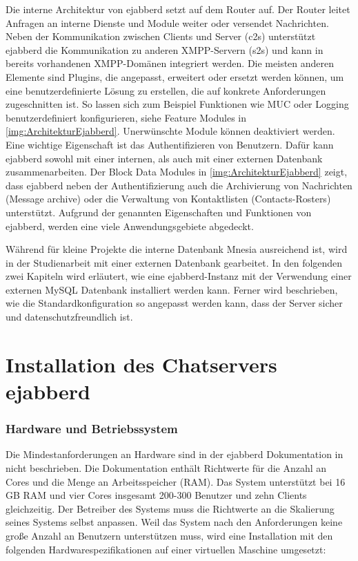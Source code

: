 \documentclass[a4paper,titlepage,halfparskip,12pt]{scrreprt}
\begin{document}
\begin{onehalfspacing}
Die interne Architektur von ejabberd setzt auf dem Router auf. Der Router leitet Anfragen an interne Dienste und Module weiter oder versendet Nachrichten. Neben der Kommunikation zwischen Clients und Server (c2s) unterstützt ejabberd die Kommunikation zu anderen \ac{XMPP}-Servern (s2s) und kann in bereits vorhandenen \ac{XMPP}-Domänen integriert werden. Die meisten anderen Elemente sind Plugins, die angepasst, erweitert oder ersetzt werden können, um eine benutzerdefinierte Lösung zu erstellen, die auf konkrete Anforderungen zugeschnitten ist. So lassen sich zum Beispiel Funktionen wie \ac{MUC} oder Logging benutzerdefiniert konfigurieren, siehe Feature Modules in \autoref{img:ArchitekturEjabberd}. Unerwünschte Module können deaktiviert werden. Eine wichtige Eigenschaft ist das Authentifizieren von Benutzern. Dafür kann ejabberd sowohl mit einer internen, als auch mit einer externen Datenbank zusammenarbeiten. Der Block Data Modules in \autoref{img:ArchitekturEjabberd} zeigt, dass ejabberd neben der Authentifizierung auch die Archivierung von Nachrichten (Message archive) oder die Verwaltung von Kontaktlisten (Contacts-Rosters) unterstützt. Aufgrund der genannten Eigenschaften und Funktionen von ejabberd, werden eine viele Anwendungsgebiete abgedeckt.\cite{ejabberdModulesDeployment, ejabberdDoc}

Während für kleine Projekte die interne Datenbank Mnesia ausreichend ist, wird in der Studienarbeit mit einer externen Datenbank gearbeitet. In den folgenden zwei Kapiteln wird erläutert, wie eine ejabberd-Instanz mit der Verwendung einer externen MySQL Datenbank installiert werden kann. Ferner wird beschrieben, wie die Standardkonfiguration so angepasst werden kann, dass der Server sicher und datenschutzfreundlich ist.

\pagebreak

\section{Installation des Chatservers ejabberd}
\label{sec:InstallationEjabberd}

\subsubsection*{Hardware und Betriebssystem}

Die Mindestanforderungen an Hardware sind in der ejabberd Dokumentation in \cite{ejabberdDocGettingStarted} nicht beschrieben. Die Dokumentation enthält Richtwerte für die Anzahl an Cores und die Menge an Arbeitsspeicher (RAM). Das System unterstützt bei 16 GB RAM und vier Cores insgesamt 200-300 Benutzer und zehn Clients gleichzeitig. Der Betreiber des Systems muss die Richtwerte an die Skalierung seines Systems selbst anpassen. Weil das System nach den Anforderungen keine große Anzahl an Benutzern unterstützen muss, wird eine Installation mit den folgenden Hardwarespezifikationen auf einer virtuellen Maschine umgesetzt:


\end{onehalfspacing}
\end{document}
